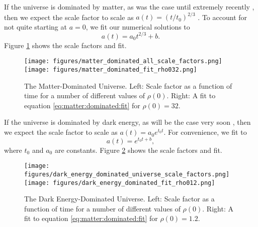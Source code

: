 \documentclass[]{article}
\begin{document}
If the universe is dominated by matter, as was the case until
extremely recently \cite{Kempf}, then we expect the scale factor to
scale as $a(t) = \left(t/t_0\right)^{2/3}$ \cite{Kempf}. To account
for not quite starting at $a=0$, we fit our numerical solutions to
\begin{equation}
  \label{eq:matter:dominated:fit}
  a(t) = a_0 t^{2/3} + b.
\end{equation}
Figure \ref{fig:matter:dominated} shows the scale factors and fit.
\begin{figure}[htb]
  \begin{center}
    \leavevmode
    \hspace{-.2cm}
     \texttt{[image: figures/matter\_dominated\_all\_scale\_factors.png]}
     \hspace{-0.3cm}
     \texttt{[image: figures/matter\_dominated\_fit\_rho032.png]}
     \caption[Matter Dominated Universe]{The Matter-Dominated
       Universe. Left: Scale factor as a function of time for a number
       of different values of $\rho(0)$. Right: A fit to equation
       \eqref{eq:matter:dominated:fit} for $\rho(0)=32$.}
    \label{fig:matter:dominated}
  \end{center}
\end{figure}

If the universe is dominated by dark energy, as will be the case very
soon \cite{Kempf}, then we expect the scale factor to scale as
$a(t)=a_0 e^{t_0t}$. For convenience, we fit to
\begin{equation}
  \label{eq:dark:energy:dominated:fit}
  a(t) = e^{t_0t + b},
\end{equation}
where $t_0$ and $a_0$ are constants. Figure
\ref{fig:dark:energy:dominated} shows the scale factors and fit.
\begin{figure}[htb]
  \begin{center}
    \leavevmode
    \hspace{-.2cm}
     \texttt{[image: figures/dark\_energy\_dominated\_universe\_scale\_factors.png]}
     \hspace{-0.3cm}
     \texttt{[image: figures/dark\_energy\_dominated\_fit\_rho012.png]}
     \caption[Matter Dominated Universe]{The Dark Energy-Dominated
       Universe. Left: Scale factor as a function of time for a number
       of different values of $\rho(0)$. Right: A fit to equation
       \eqref{eq:matter:dominated:fit} for $\rho(0)=1.2$.}
    \label{fig:dark:energy:dominated}
  \end{center}
\end{figure}
\end{document}
